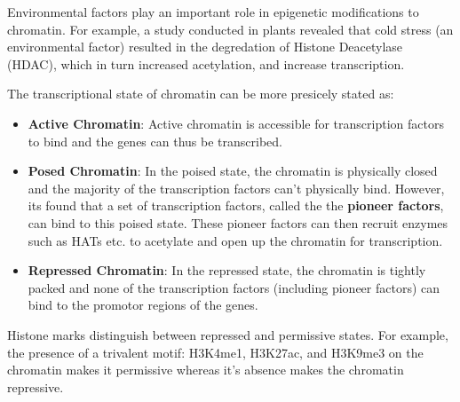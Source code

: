 \documentclass[letterpaper,12pt]{article}
\begin{document}
Environmental factors play an important role in epigenetic modifications to chromatin. For example, a study conducted in plants revealed that cold stress (an environmental factor) resulted in the degredation of Histone Deacetylase (HDAC), which in turn increased acetylation, and increase transcription\cite{Park_Lim_2018}.\vspace{1.5cm}

The transcriptional state of chromatin can be more presicely stated as:
\begin{itemize}
	\item \textbf{Active Chromatin}: Active chromatin is accessible for transcription factors to bind and the genes can thus be transcribed.
	\item \textbf{Posed Chromatin}: In the poised state, the chromatin is physically closed and the majority of the transcription factors can't physically bind. However, its found that a set of transcription factors, called the the \textbf{pioneer factors}, can bind to this poised state. These pioneer factors can then recruit enzymes such as HATs etc. to acetylate and open up the chromatin for transcription.
	\item \textbf{Repressed Chromatin}: In the repressed state, the chromatin is tightly packed and none of the transcription factors (including pioneer factors) can bind to the promotor regions of the genes.
\end{itemize}

Histone marks distinguish between repressed and permissive states. For example, the presence of a trivalent motif: H3K4me1, H3K27ac, and H3K9me3 on the chromatin makes it permissive whereas it's absence makes the chromatin repressive.\vspace{0.5cm}

\setlength{\fboxsep}{10pt}
\noindent{}

\newpage


\end{document}
